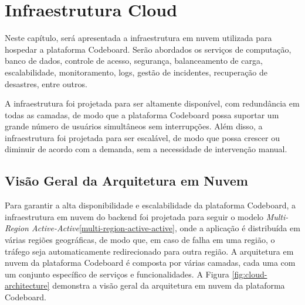 


\section{Infraestrutura Cloud}

Neste capítulo, será apresentada a infraestrutura em nuvem utilizada para hospedar a plataforma Codeboard. Serão abordados os serviços de computação, banco de dados, controle de acesso, segurança, balanceamento de carga, escalabilidade, monitoramento, logs, gestão de incidentes, recuperação de desastres, entre outros. 

A infraestrutura foi projetada para ser altamente disponível, com redundância em todas as camadas, de modo que a plataforma Codeboard possa suportar um grande número de usuários simultâneos sem interrupções. Além disso, a infraestrutura foi projetada para ser escalável, de modo que possa crescer ou diminuir de acordo com a demanda, sem a necessidade de intervenção manual.

\subsection{Visão Geral da Arquitetura em Nuvem}

Para garantir a alta disponibilidade e escalabilidade da plataforma Codeboard, a infraestrutura em nuvem do backend foi projetada para seguir o modelo \emph{Multi-Region Active-Active}\ref{multi-region-active-active}, onde a aplicação é distribuída em várias regiões geográficas, de modo que, em caso de falha em uma região, o tráfego seja automaticamente redirecionado para outra região. A arquitetura em nuvem da plataforma Codeboard é composta por várias camadas, cada uma com um conjunto específico de serviços e funcionalidades. A Figura \ref{fig:cloud-architecture} demonstra a visão geral da arquitetura em nuvem da plataforma Codeboard. 

